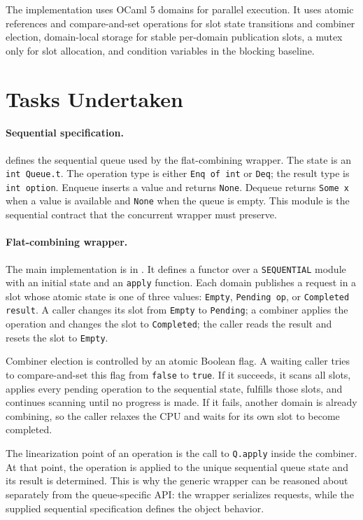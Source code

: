 \documentclass[11pt,a4paper]{article}
\begin{document}
The implementation uses OCaml 5 domains for parallel execution. It uses atomic references and compare-and-set operations for slot state transitions and combiner election, domain-local storage for stable per-domain publication slots, a mutex only for slot allocation, and condition variables in the blocking baseline.

\section{Tasks Undertaken}
\paragraph{Sequential specification.}
 defines the sequential queue used by the flat-combining wrapper. The state is an \texttt{int Queue.t}. The operation type is either \texttt{Enq of int} or \texttt{Deq}; the result type is \texttt{int option}. Enqueue inserts a value and returns \texttt{None}. Dequeue returns \texttt{Some x} when a value is available and \texttt{None} when the queue is empty. This module is the sequential contract that the concurrent wrapper must preserve.

\paragraph{Flat-combining wrapper.}
The main implementation is in . It defines a functor over a \texttt{SEQUENTIAL} module with an initial state and an \texttt{apply} function. Each domain publishes a request in a slot whose atomic state is one of three values: \texttt{Empty}, \texttt{Pending op}, or \texttt{Completed result}. A caller changes its slot from \texttt{Empty} to \texttt{Pending}; a combiner applies the operation and changes the slot to \texttt{Completed}; the caller reads the result and resets the slot to \texttt{Empty}.

Combiner election is controlled by an atomic Boolean flag. A waiting caller tries to compare-and-set this flag from \texttt{false} to \texttt{true}. If it succeeds, it scans all slots, applies every pending operation to the sequential state, fulfills those slots, and continues scanning until no progress is made. If it fails, another domain is already combining, so the caller relaxes the CPU and waits for its own slot to become completed.

The linearization point of an operation is the call to \texttt{Q.apply} inside the combiner. At that point, the operation is applied to the unique sequential queue state and its result is determined. This is why the generic wrapper can be reasoned about separately from the queue-specific API: the wrapper serializes requests, while the supplied sequential specification defines the object behavior.
\end{document}
